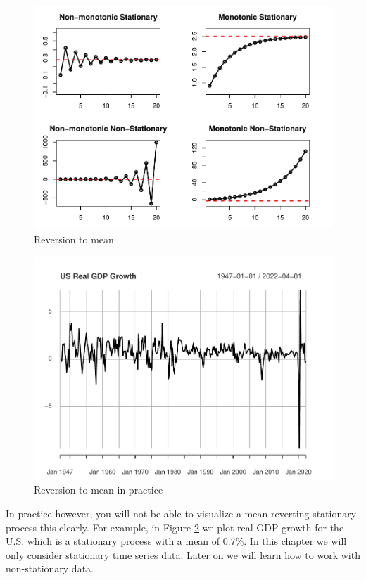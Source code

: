\documentclass[]{book}
\theoremstyle{definition}
\theoremstyle{definition}
\theoremstyle{definition}
\theoremstyle{remark}
\begin{document}
\begin{figure}

{\centering \includegraphics[width=0.8\linewidth]{bookdown-demo_files/figure-latex/ch6-figure1-1} 

}

\caption{Reversion to mean}\label{fig:ch6-figure1}
\end{figure}

\begin{figure}

{\centering \includegraphics[width=0.8\linewidth]{bookdown-demo_files/figure-latex/ch6-figure2-1} 

}

\caption{Reversion to mean in practice}\label{fig:ch6-figure2}
\end{figure}

In practice however, you will not be able to visualize a mean-reverting
stationary process this clearly. For example, in Figure
\ref{fig:ch6-figure2} we plot real GDP growth for the U.S. which is a
stationary process with a mean of 0.7\%. In this chapter we will only
consider stationary time series data. Later on we will learn how to work
with non-stationary data.
\end{document}
